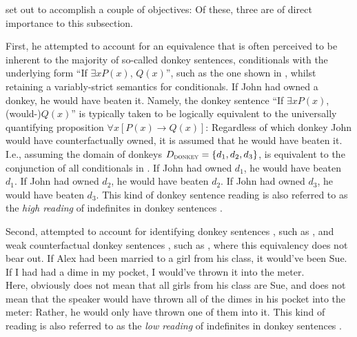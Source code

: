\textcite{vanRooij2006} set out to accomplish a couple of objectives: Of these, three are of direct importance to this subsection.

First, he attempted to account for an equivalence that is often perceived to be inherent to the majority of so-called donkey sentences, conditionals with the underlying form \enquote{If $\exists{x}P(x)$, $Q(x)$}, such as the one shown in , whilst retaining a variably-strict semantics for conditionals.
\ex
If John had owned a donkey, he would have beaten it.
\xe
Namely, the donkey sentence \enquote{If $\exists{x}P(x)$, (would-)$Q(x)$} is typically taken to be logically equivalent to the universally quantifying proposition $\forall{x}[P(x)\rightarrow Q(x)]$: Regardless of which donkey John would have counterfactually owned, it is assumed that he would have beaten it. I.e., assuming the domain of donkeys $D_\text{\scshape donkey}=\{d_1,d_2,d_3\}$,  is equivalent to the conjunction of all conditionals in .
\pex\label{ex:donkey-conjunction}
\a If John had owned $d_1$, he would have beaten $d_1$.
\a If John had owned $d_2$, he would have beaten $d_2$.
\a If John had owned $d_3$, he would have beaten $d_3$.
\xe
This kind of donkey sentence reading is also referred to as the \textit{high reading} of indefinites in donkey sentences \parencite{Walker2015}.

Second, \textcite{vanRooij2006} attempted to account for identifying donkey sentences \parencite[p.~393f]{vanRooij2006}, such as , and weak counterfactual donkey sentences \parencite[first (non-counterfactual) observation due][]{Schubert1987}, such as , where this equivalency does not bear out.
\pex
\a  If Alex had been married to a girl from his class, it would've been Sue.\\\emptyfill\parencite[adapted from][p.~394]{vanRooij2006}
\a  If I had had a dime in my pocket, I would've thrown it into the meter.\\\emptyfill\parencites[adapted from][]{Schubert1987}[p.~395]{vanRooij2006}
\xe
Here,  obviously does not mean that all girls from his class are Sue, and  does not mean that the speaker would have thrown all of the dimes in his pocket into the meter: Rather, he would only have thrown one of them into it. This kind of reading is also referred to as the \textit{low reading} of indefinites in donkey sentences \parencite{Walker2015}.

